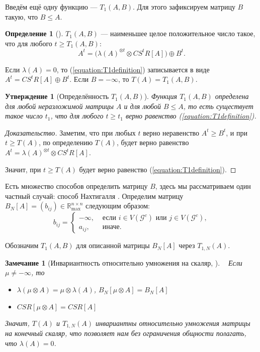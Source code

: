 \documentclass[12pt]{article}
\newtheorem{proposition}[theorem]{Утверждение}
\newtheorem{remark}[theorem]{Замечание}
\theoremstyle{definition}
\newtheorem{definition}[theorem]{Определение}
\begin{document}
Введём ещё одну функцию --- $T_1(A, B)$. Для этого зафиксируем матрицу $B$ такую, что $B \le A$.

\begin{definition} [{\cite[страница 165]{15WeakCSRExpantion}}]
\label{T1definition}
$T_1(A, B)$ --- наименьшее целое положительное число такое, что для любого $t \ge T_1(A, B)$:
\begin{equation}
\label{equation:T1definition}
    A^t = \big(\lambda(A)^{\otimes t} \otimes CS^tR[A] \big) \oplus B^t.
\end{equation}
\end{definition}

Если $\lambda(A) = 0$, то (\ref{equation:T1definition}) записывается в виде $A^t = CS^tR[A] \oplus B^t$. Если $B = -\infty$, то $T(A) = T_1(A, B)$.

\begin{proposition} [Определённость $T_1(A, B)$]
Функция $T_1(A, B)$ определена для любой неразложимой матрицы $A$ и для любой $B \le A$, то есть существует такое число $t_1$, что для любого $t \ge t_1$ верно равенство (\ref{equation:T1definition}).
\end{proposition}
\begin{proof}[Доказательство]
Заметим, что при любых $t$ верно неравенство $A^t \ge B^t$, и при $t \ge T(A)$, по определению $T(A)$, будет верно равенство $A^t = \lambda(A)^{\otimes t} \otimes CS^tR[A]$.

Значит, при $t \ge T(A)$ будет верно равенство (\ref{equation:T1definition}).
\end{proof}

Есть множество способов определить матрицу $B$, здесь мы рассматриваем один частный случай: способ Нахтигалля \cite[страница 170]{15WeakCSRExpantion}. Определим матрицу $B_N[A] = (b_{ij}) \in \mathbb{R}_{\max}^{n \times n}$ следующим образом:
\begin{equation*}
    b_{ij} = 
    \begin{cases}
        -\infty,& \text{ если $i \in V(\mathcal{G}^c)$ или $j\in V(\mathcal{G}^c)$}, \\
        a_{ij},& \text{ иначе.}
    \end{cases}
\end{equation*}

Обозначим $T_1(A, B)$ для описанной матрицы $B_N[A]$ через $T_{1, N}(A)$.

\begin{remark} [{Инвариантность относительно умножения на скаляр, \cite[страница 287]{bounds}}] { \ }
\label{invarianceOfT}
Если $\mu \ne -\infty$, то

\begin{itemize}
	\item $\lambda(\mu \otimes A) = \mu \otimes \lambda(A)$, $B_N[\mu \otimes A] = B_N[A]$
	\item $CSR[\mu \otimes A] = CSR[A]$
\end{itemize}

Значит, $T(A)$ и $T_{1, N}(A)$ инвариантны относительно умножения матрицы на конечный скаляр, что позволяет нам без ограничения общности полагать, что $\lambda(A) = 0$.
\end{remark}
\end{document}
